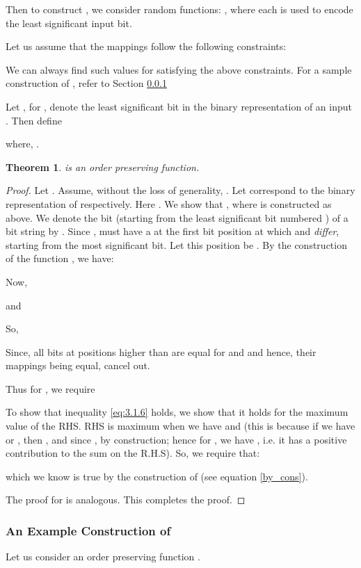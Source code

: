 \documentclass[11pt, letterpaper, romanappendices, onecolumn]{article}
\theoremstyle{plain}\newtheorem{thm}{Theorem}[section]
\theoremstyle{definition}
\theoremstyle{remark}
\begin{document}
\par Then to construct , we consider  random functions: , where each  is used to encode the  least significant input bit.

Let us assume that the mappings follow the following constraints:


\par We can always find such values for  satisfying the above constraints. For a sample construction of , refer to Section \ref{excons}
\par Let , for , denote the  least significant bit in the binary representation of an input . Then define

where, .

\begin{thm}\label{ope}
 is an order preserving function.
\end{thm}
\begin{proof}
Let . Assume, without the loss of generality, . Let  correspond to the binary representation of  respectively. Here . We show that , where  is constructed as above. We denote the  bit (starting from the least significant bit numbered ) of a bit string  by . Since ,  must have a  at the first bit position at which  and  \textit{differ}, starting from the most significant bit. Let this position be . By the construction of the function , we have:


\par Now,

and 


So,

Since, all bits at positions higher than  are equal for  and  and hence, their mappings being equal, cancel out.

\par Thus for , we require


To show that inequality \eqref{eq:3.1.6} holds, we show that it holds for the maximum value of the RHS. RHS is maximum when we have  and  (this is because if we have  or , then , and since , by construction; hence for , we have , i.e. it has a positive contribution to the sum on the R.H.S). So, we require that:

which we know is true by the construction of  (see equation \eqref{by_cons}).

The proof for    is analogous. This completes the proof. 
\end{proof}

\subsubsection{An Example Construction of } \label{excons}
Let us consider an order preserving function .
\end{document}
